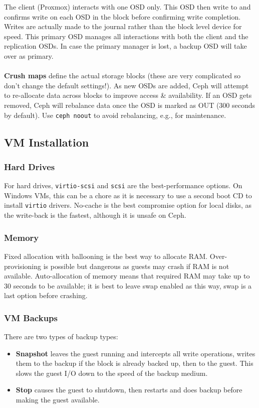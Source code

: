 \documentclass[a4paper,11pt]{article}
\begin{document}
The client (Proxmox) interacts with one OSD only.
This OSD then write to and confirms write on each OSD in the block before confirming write completion.
Writes are actually made to the journal rather than the block level device for speed.
This primary OSD manages all interactions with both the client and the replication OSDs.
In case the primary manager is lost, a backup OSD will take over as primary.
\\\\
\textbf{Crush maps} define the actual storage blocks (these are very complicated so don't change the default settings!).
As new OSDs are added, Ceph will attempt to re-allocate data across blocks to improve access \& availability.
If an OSD gets removed, Ceph will rebalance data once the OSD is marked as OUT (300 seconds by default).
Use \verb|ceph noout| to avoid rebalancing, e.g., for maintenance.

\subsection{VM Installation}
\subsubsection{Hard Drives}
For hard drives, \verb|virtio-scsi| and \verb|scsi| are the best-performance options.
On Windows VMs, this can be a chore as it is necessary to use a second boot CD to install \verb|virtio| drivers.
No-cache is the best compromise option for local disks, as the write-back is the fastest, although it is unsafe on Ceph.

\subsubsection{Memory}
Fixed allocation with ballooning is the best way to allocate RAM.
Over-provisioning is possible but dangerous as guests may crash if RAM is not available.
Auto-allocation of memory means that required RAM may take up to 30 seconds to be available;
it is best to leave swap enabled as this way, swap is a last option before crashing.

\subsubsection{VM Backups}
There are two types of backup types:
\begin{itemize}
    \item   \textbf{Snapshot} leaves the guest running and intercepts all write operations, writes them to the backup if the block is already backed up, then to the guest.
            This slows the guest I/O down to the speed of the backup medium.
    \item   \textbf{Stop} causes the guest to shutdown, then restarts and does backup before making the guest available.
\end{itemize}
\end{document}
